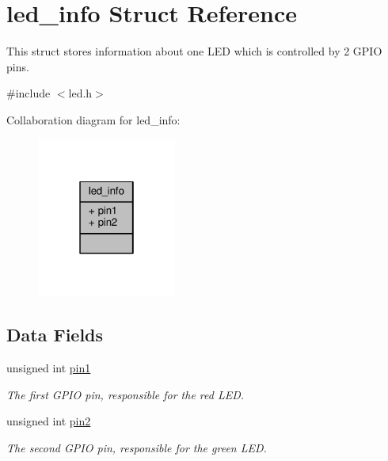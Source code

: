 \hypertarget{structled__info}{}\section{led\+\_\+info Struct Reference}
\label{structled__info}


This struct stores information about one L\+E\+D which is controlled by 2 G\+P\+I\+O pins.  




{\ttfamily \#include $<$led.\+h$>$}



Collaboration diagram for led\+\_\+info\+:\nopagebreak
\begin{figure}[H]
\begin{center}
\leavevmode
\includegraphics[width=130pt]{structled__info__coll__graph}
\end{center}
\end{figure}
\subsection*{Data Fields}
\begin{DoxyCompactItemize}
\item 
\hypertarget{structled__info_a3fc6cc33e12f94e78c5cbdc71d5416bc}{}unsigned int \hyperlink{structled__info_a3fc6cc33e12f94e78c5cbdc71d5416bc}{pin1}\label{structled__info_a3fc6cc33e12f94e78c5cbdc71d5416bc}

\begin{DoxyCompactList}\small\item\em The first G\+P\+I\+O pin, responsible for the red L\+E\+D. \end{DoxyCompactList}\item 
\hypertarget{structled__info_a9ff95d672cc5c5cd128fefae948d73fd}{}unsigned int \hyperlink{structled__info_a9ff95d672cc5c5cd128fefae948d73fd}{pin2}\label{structled__info_a9ff95d672cc5c5cd128fefae948d73fd}

\begin{DoxyCompactList}\small\item\em The second G\+P\+I\+O pin, responsible for the green L\+E\+D. \end{DoxyCompactList}\end{DoxyCompactItemize}


